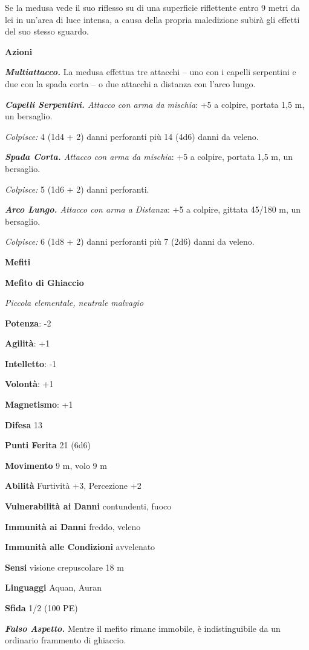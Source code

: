 \begin{multicols}{2}
Se la medusa vede il suo riflesso su di una superficie riflettente entro
9 metri da lei in un'area di luce intensa, a causa della propria
maledizione subirà gli effetti del suo stesso sguardo.

\textbf{Azioni}

\emph{\textbf{Multiattacco.}} La medusa effettua tre attacchi -- uno con
i capelli serpentini e due con la spada corta -- o due attacchi a
distanza con l'arco lungo.

\emph{\textbf{Capelli Serpentini.} Attacco con arma da mischia}: +5 a
colpire, portata 1,5 m, un bersaglio.

\emph{Colpisce:} 4 (1d4 + 2) danni perforanti più 14 (4d6) danni da
veleno.

\emph{\textbf{Spada Corta.} Attacco con arma da mischia}: +5 a colpire,
portata 1,5 m, un bersaglio.

\emph{Colpisce:} 5 (1d6 + 2) danni perforanti.

\emph{\textbf{Arco Lungo.} Attacco con arma a Distanza}: +5 a colpire,
gittata 45/180 m, un bersaglio.

\emph{Colpisce:} 6 (1d8 + 2) danni perforanti più 7 (2d6) danni da
veleno.

\textbf{Mefiti}

\textbf{Mefito di Ghiaccio}

\emph{Piccola elementale, neutrale malvagio}

\textbf{Potenza}: -2

\textbf{Agilità}: +1

\textbf{Intelletto}: -1

\textbf{Volontà}: +1

\textbf{Magnetismo}: +1

\textbf{Difesa} 13

\textbf{Punti Ferita} 21 (6d6)

\textbf{Movimento} 9 m, volo 9 m

\textbf{Abilità} Furtività +3, Percezione +2

\textbf{Vulnerabilità ai Danni} contundenti, fuoco

\textbf{Immunità ai Danni} freddo, veleno

\textbf{Immunità alle Condizioni} avvelenato

\textbf{Sensi} visione crepuscolare 18 m

\textbf{Linguaggi} Aquan, Auran

\textbf{Sfida} 1/2 (100 PE)

\emph{\textbf{Falso Aspetto.}} Mentre il mefito rimane immobile, è
indistinguibile da un ordinario frammento di ghiaccio.


\end{multicols}
